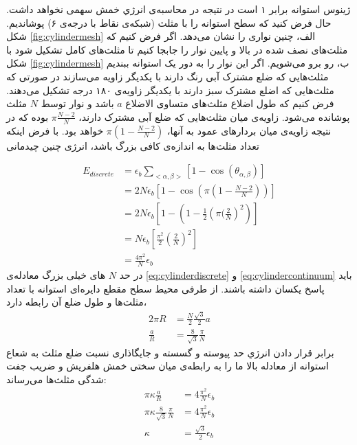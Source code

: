ژینوس استوانه برابر ۱ است در نتیجه‌ در محاسبه‌ی انرژي خمش سهمی نخواهد داشت. حال فرض کنید که سطح استوانه را با مثلث (شبکه‌ی نقاط با درجه‌ی ۶) پوشاندیم. شکل
\ref{fig:cylindermesh}
الف، چنین نواری را نشان می‌دهد. اگر فرض کنیم که مثلث‌های نصف شده در بالا و پایین نوار را جابجا کنیم تا مثلث‌های کامل تشکیل شود با شکل
\ref{fig:cylindermesh}
ب، رو برو می‌شویم. اگر این نوار را به دور یک استوانه ببندیم مثلث‌هایی که ضلع مشترک آبی رنگ دارند با یکدیگر زاویه می‌سازند در صورتی که مثلث‌هایی که اضلع مشترک  سبز دارند با یکدیگر زاویه‌ی ۱۸۰ درجه تشکیل می‌دهند. فرض کنیم که طول اضلاع مثلث‌های متساوی الاضلاع 
$a$
 باشد و نوار توسط 
 $N$
 مثلث پوشانده می‌شود. زاویه‌ی میان مثلث‌هایی که ضلع آبی مشترک دارند،
 $\pi\frac{N-2}{N}$
بوده که در نتیجه زاویه‌ی میان بردار‌های عمود به آنها،
 $\pi(1-\frac{N-2}{N})$
خواهد بود. با فرض اینکه تعداد مثلث‌ها به اندازه‌ی کافی بزرگ باشد، انرژی چنین چیدمانی

\begin{equation}
\begin{aligned}
E_{discrete}&=\epsilon_b\sum_{<\alpha,\beta>}\left[1-\cos(\theta_{\alpha,\beta})\right]\\
&=2N\epsilon_b\left[1-\cos\left(\pi(1-\frac{N-2}{N})\right)\right]\\
&=2N\epsilon_b\left[1-\left(1-\frac{1}{2}\left(\pi(\frac{2}{N}\right)^2\right)\right]\\
&=N\epsilon_b\left[\frac{\pi^2}{2}\left(\frac{2}{N}\right)^2\right]\\
&=\frac{4\pi^2}{N}\epsilon_b
\end{aligned}
\label{eq:cylinderdiscrete}
\end{equation} 
در حد 
$N$
های خیلی بزرگ معادله‌ی 
\ref{eq:cylinderdiscrete}
 و 
\ref{eq:cylindercontinuum}
باید پاسخ یکسان داشته باشند. از طرفی محیط سطح مقطع دایره‌ای استوانه با تعداد مثلث‌ها و طول ضلع آن رابطه دارد،
\begin{equation}
\begin{aligned}
2 \pi R &= \frac{N}{2}\frac{\sqrt3}{2}a\\
\frac{a}{R}&=\frac{8}{\sqrt3}\frac{\pi}{N}
\end{aligned}
\label{eq:cylinderdiscretisation}
\end{equation} 
برابر قرار دادن انرژي حد پیوسته و گسسته و جایگاذاری نسبت ضلع مثلث به شعاع استوانه از معادله بالا ما را به رابطه‌ی میان سختی خمش هلفریش و ضریب جفت شدگی مثلث‌ها می‌رساند:
\begin{equation}
\begin{aligned}
\pi\kappa\frac{a}{R}&=4\frac{\pi^2}{N}\epsilon_b\\
\pi\kappa\frac{8}{\sqrt3}\frac{\pi}{N}&=4\frac{\pi^2}{N}\epsilon_b\\
\kappa&=\frac{\sqrt{3}}{2}\epsilon_b
\end{aligned}
\label{eq:epsilonkappa}
\end{equation} 













